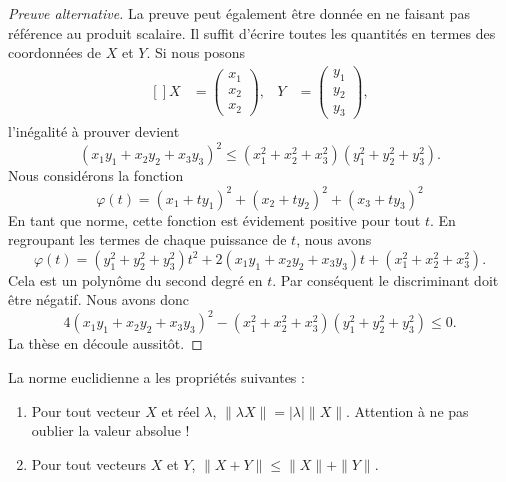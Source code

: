 \begin{proof}[Preuve alternative]
	La preuve peut également être donnée en ne faisant pas référence au produit scalaire. Il suffit d'écrire toutes les quantités en termes des coordonnées de $X$ et $Y$. Si nous posons
	\begin{equation}
		\begin{aligned}[]
			X&=\begin{pmatrix}
				x_1	\\ 
				x_2	\\ 
				x_2	
			\end{pmatrix},
			&Y&=\begin{pmatrix}
				y_1	\\ 
				y_2	\\ 
				y_3	
			\end{pmatrix},
		\end{aligned}
	\end{equation}
	l'inégalité à prouver devient
	\begin{equation}
		(x_1y_1+x_2y_2+x_3y_3)^2\leq (x_1^2+x_2^2+x_3^2)(y_1^2+y_2^2+y_3^2).
	\end{equation}
	Nous considérons la fonction
	\begin{equation}
		\varphi(t)=(x_1+ty_1)^2+(x_2+ty_2)^2+(x_3+ty_3)^2
	\end{equation}
	En tant que norme, cette fonction est évidement positive pour tout $t$. En regroupant les termes de chaque puissance de $t$, nous avons
	\begin{equation}
		\varphi(t)=(y_1^2+y_2^2+y_3^2)t^2+2(x_1y_1+x_2y_2+x_3y_3)t+(x_1^2+x_2^2+x_3^2).
	\end{equation}
	Cela est un polynôme du second degré en $t$. Par conséquent le discriminant doit être négatif. Nous avons donc
	\begin{equation}
		4(x_1y_1+x_2y_2+x_3y_3)^2-(x_1^2+x_2^2+x_3^2)(y_1^2+y_2^2+y_3^2)\leq 0.
	\end{equation}
	La thèse en découle aussitôt.
\end{proof}

\begin{proposition}
	La norme euclidienne a les propriétés suivantes :
	\begin{enumerate}
		\item
			Pour tout vecteur $X$ et réel $\lambda$,  $\| \lambda X \|=| \lambda |\| X \|$. Attention à ne pas oublier la valeur absolue !
		\item
			Pour tout vecteurs $X$ et $Y$, $\| X+Y \|\leq \| X \|+\| Y \|$.
	\end{enumerate}
\end{proposition}

